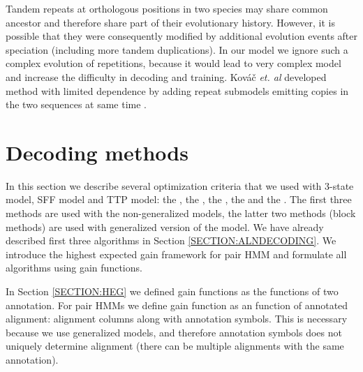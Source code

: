 Tandem repeats at orthologous positions in two species may share common
ancestor and therefore share part of their evolutionary history. However, it is
possible that they were consequently modified by additional evolution events
after speciation (including more tandem duplications). In our model we ignore
such a complex evolution of repetitions, because it would lead to very complex
model and increase the difficulty in decoding and training. Kováč {\it et. al}
developed method with limited dependence by adding repeat submodels emitting
copies in the two sequences at same time \cite{Kovac2012}.

\section{Decoding methods}\label{SECTION:REPDECODING}
In this section we describe several optimization criteria that we used with
3-state model, SFF model and TTP model: the , the , the
, the  and the .
The first three methods are used with the non-generalized models, the latter
two methods (block methods) are used with generalized version of the model. We
have already described first three algorithms in Section
\ref{SECTION:ALNDECODING}.  We introduce the highest expected gain framework
for pair HMM and formulate all algorithms using gain functions.

In Section \ref{SECTION:HEG} we defined gain functions as the functions of two
annotation. For pair HMMs we define gain function as an function of annotated
alignment: alignment columns along with annotation symbols. This is necessary
because we use generalized models, and therefore annotation symbols does not
uniquely determine alignment (there can be multiple alignments with the same
annotation).

